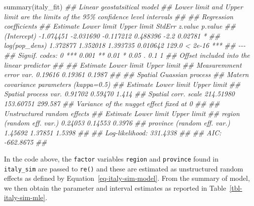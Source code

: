 \documentclass[
  letterpaper,
]{krantz}
\newenvironment{Shaded}{\begin{snugshade}}{\end{snugshade}}
\newcommand{\DocumentationTok}[1]{\textcolor[rgb]{0.37,0.37,0.37}{\textit{#1}}}
\newcommand{\FunctionTok}[1]{\textcolor[rgb]{0.28,0.35,0.67}{#1}}
\newcommand{\NormalTok}[1]{\textcolor[rgb]{0.00,0.23,0.31}{#1}}
\begin{document}
\begin{Shaded}
\begin{Highlighting}[]
\FunctionTok{summary}\NormalTok{(italy\_fit)}
\DocumentationTok{\#\# Linear geostatsitical model }
\DocumentationTok{\#\# \textquotesingle{}Lower limit\textquotesingle{} and \textquotesingle{}Upper limit\textquotesingle{} are the limits of the 95\% confidence level intervals }
\DocumentationTok{\#\# }
\DocumentationTok{\#\#  Regression coefficients }
\DocumentationTok{\#\#                Estimate Lower limit Upper limit    StdErr z.value p.value    }
\DocumentationTok{\#\# (Intercept)   {-}1.074451   {-}2.031690   {-}0.117212  0.488396    {-}2.2 0.02781 *  }
\DocumentationTok{\#\# log(pop\_dens)  1.372877    1.352018    1.393735  0.010642   129.0 \textless{} 2e{-}16 ***}
\DocumentationTok{\#\# {-}{-}{-}}
\DocumentationTok{\#\# Signif. codes:  0 \textquotesingle{}***\textquotesingle{} 0.001 \textquotesingle{}**\textquotesingle{} 0.01 \textquotesingle{}*\textquotesingle{} 0.05 \textquotesingle{}.\textquotesingle{} 0.1 \textquotesingle{} \textquotesingle{} 1}
\DocumentationTok{\#\# Offset included into the linear predictor }
\DocumentationTok{\#\# }
\DocumentationTok{\#\#                          Estimate Lower limit Upper limit}
\DocumentationTok{\#\# Measuremment error var.  0.19616     0.19361      0.1987}
\DocumentationTok{\#\# }
\DocumentationTok{\#\#  Spatial Guassian process }
\DocumentationTok{\#\# Matern covariance parameters (kappa=0.5) }
\DocumentationTok{\#\#                       Estimate Lower limit Upper limit}
\DocumentationTok{\#\# Spatial process var.   0.91702     0.59470       1.414}
\DocumentationTok{\#\# Spatial corr. scale  214.51980   153.60751     299.587}
\DocumentationTok{\#\# Variance of the nugget effect fixed at 0 }
\DocumentationTok{\#\# }
\DocumentationTok{\#\#  Unstructured random effects }
\DocumentationTok{\#\#                             Estimate Lower limit Upper limit}
\DocumentationTok{\#\# region (random eff. var.)    0.24053     0.14553      0.3976}
\DocumentationTok{\#\# province (random eff. var.)  1.45692     1.37851      1.5398}
\DocumentationTok{\#\# }
\DocumentationTok{\#\#  Log{-}likelihood: 331.4338}
\DocumentationTok{\#\# }
\DocumentationTok{\#\#  AIC: {-}662.8675}
\DocumentationTok{\#\# }
\end{Highlighting}
\end{Shaded}

In the code above, the \texttt{factor} variables \texttt{region} and
\texttt{province} found in \texttt{italy\_sim} are passed to
\texttt{re()} and these are estimated as unstructured random effects as
defined by Equation~\ref{eq-italy-sim-model}. From the summary of model,
we then obtain the parameter and interval estimates as reported in
Table~\ref{tbl-italy-sim-mle}.
\end{document}
